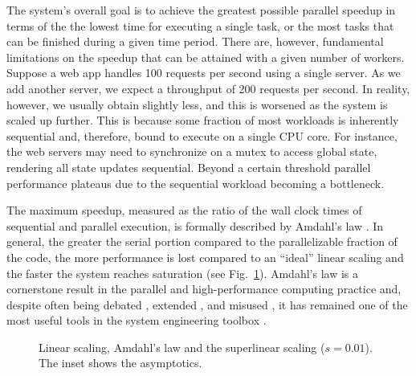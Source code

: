 The system's overall goal is to achieve the greatest possible parallel speedup in terms of the the lowest time for executing a single task, or the most tasks that can be finished during a given time period. There are, however, fundamental limitations on the speedup that can be attained with a given number of workers.  Suppose a web app handles 100 requests per second using a single server. As we add another server, we expect a throughput of 200 requests per second. In reality, however, we usually obtain slightly less, and this is worsened as the system is scaled up further. This is because some fraction of most workloads is inherently sequential and, therefore, bound to execute on a single CPU core. For instance, the web servers may need to synchronize on a mutex to access global state, rendering all state updates sequential.  Beyond a certain threshold parallel performance plateaus due to the sequential workload becoming a bottleneck.

The maximum speedup, measured as the ratio of the wall clock times of sequential and parallel execution, is formally described by Amdahl's law \cite{10.1145/1465482.1465560}. In general, the greater the serial portion compared to the parallelizable fraction of the code, the more performance is lost compared to an ``ideal'' linear scaling and the faster the system reaches saturation (see Fig.~\ref{fig:amdahl}). Amdahl's law is a cornerstone result in the parallel and high-performance computing practice and, despite often being debated \cite{10.1145/42411.42415}, extended \cite{4563876, 6280307,1580395,406581,6163449}, and misused \cite{10.5555/775339.775386}, it has remained one of the most useful tools in the system engineering toolbox \cite{10.5555/1951599}.

\begin{figure}[t]
  \centering
  \begin{small}
  
\end{small}
  \caption{Linear scaling, Amdahl's law and the superlinear scaling ($s=0.01$). The inset shows the asymptotics.}
  \label{fig:amdahl}
\end{figure}

